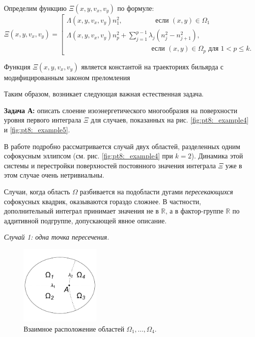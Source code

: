 Определим функцию $\Xi(x, y, v_x, v_y)$ по формуле: 
\begin{equation*}
\Xi(x, y, v_x, v_y) = \left[
\begin{array}{ll}
    \Lambda(x, y, v_x, v_y) n_1^2, \qquad  \ \ \qquad   \text{ если } (x,y) \in \Omega_1 
    \\
    \Lambda(x, y, v_x, v_y) n_p^2 + \sum_{j=1}^{p-1} \lambda_j(n_j^2-n_{j+1}^2), \\
     \qquad \qquad \qquad \qquad \qquad \qquad  \text{ если } (x,y) \in \Omega_p \text{ для } 1 < p \leq k. 
\end{array}
\right.
\end{equation*}

\begin{theorem}
Функция $\Xi(x, y, v_x, v_y)$ является константой на траекториях бильярда с модифицированным законом  преломления
\end{theorem}

Таким образом, возникает следующая важная естественная задача.

\textbf{Задача А:} описать слоение изоэнергетического многообразия на поверхности уровня первого интеграла $\Xi$ для случаев, показанных на рис. \ref{fig:pt8:_example4} и \ref{fig:pt8:_example5}. 

В работе подробно рассматривается случай двух областей, разделенных одним софокусным эллипсом (см. рис. \ref{fig:pt8:_example4} при $k=2$). Динамика этой системы и перестройки поверхностей постоянного значения интеграла $\Xi$ уже в этом случае очень нетривиальны.
\bigskip

Случаи, когда область $\Omega$ разбивается на подобласти дугами \textit{пересекающихся} софокусных квадрик, оказываются гораздо сложнее. В частности, дополнительный интеграл принимает значения не в $\mathbb{R}$, а в фактор-группе $\mathbb{R}$ по  аддитивной подгруппе, допускающей явное описание.


\textit{ Случай 1: одна точка пересечения. }

\begin{figure}[!htb]
\centering
     \includegraphics[width=0.35\textwidth]{images/ch4/section1/img2.pdf}
\caption{Взаимное расположение областей $\Omega_1,\ldots,\Omega_4$.}
    \label{fig:pt8:_example6}
\end{figure}

